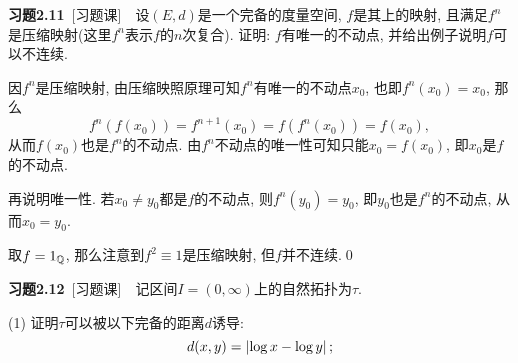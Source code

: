    \textbf{习题2.11}\ [习题课]\ \ 设$ (E,d) $是一个完备的度量空间, $ f $是其上的映射, 且满足$ f^n $是压缩映射(这里$ f^n $表示$ f $的$ n $次复合). 证明: $ f $有唯一的不动点, 并给出例子说明$ f $可以不连续.
    \begin{Proof}
    因$ f^n $是压缩映射, 由压缩映照原理可知$ f^n $有唯一的不动点$ x_0 $, 也即$ f^n(x_0)=x_0 $, 那么
    \[
    f^n(f(x_0))=f^{n+1}(x_0)=f(f^n(x_0))=f(x_0),
    \]
    从而$ f(x_0) $也是$ f^n $的不动点. 由$ f^n $不动点的唯一性可知只能$ x_0=f(x_0) $, 即$ x_0 $是$ f $的不动点.
    
    再说明唯一性. 若$ x_0\ne y_0 $都是$ f $的不动点, 则$ f^n(y_0)=y_0 $, 即$ y_0 $也是$ f^n $的不动点, 从而$ x_0=y_0 $.
    
    取$ f=1_{\mathbb{Q}} $, 那么注意到$ f^2\equiv 1 $是压缩映射, 但$ f $并不连续.\qed
    \end{Proof}
    
    \textbf{习题2.12}\ [习题课]\ \ 记区间$ I=(0,\infty) $上的自然拓扑为$ \tau $.
    
    (1) 证明$ \tau $可以被以下完备的距离$ d $诱导:
    \[
    d(x,y)=\left| \log x-\log y \right| ;
    \]
    
